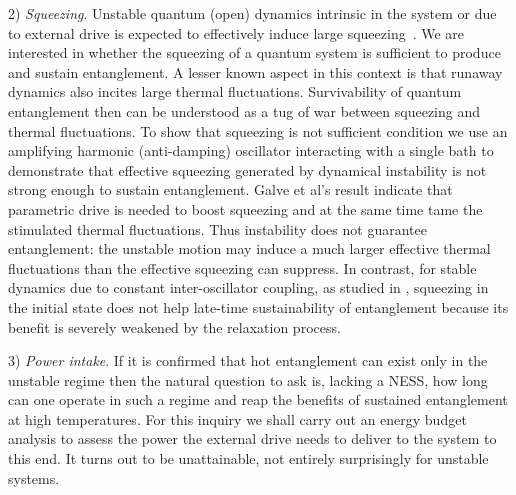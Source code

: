 \documentclass[11pt,a4paper]{article}
\begin{document}
2) \textit{Squeezing}. {Unstable quantum (open) dynamics intrinsic in the system or due to external drive is expected to effectively induce large squeezing~\cite{GP85, GS86, HH22, GV20}. We are interested in whether the squeezing of a quantum system is sufficient to produce and sustain entanglement. A lesser known aspect in this context is that runaway dynamics also incites large thermal fluctuations. Survivability of quantum entanglement then can be understood as a tug of war between squeezing and thermal fluctuations. To show that squeezing is not sufficient condition we use an {amplifying harmonic (anti-damping)} oscillator interacting with a single bath to demonstrate that effective squeezing generated by dynamical instability is not strong enough to sustain entanglement.  Galve et al's result indicate that parametric drive is needed to boost squeezing and at the same time tame the stimulated thermal fluctuations. Thus instability does not guarantee entanglement: the unstable motion may induce a much larger effective thermal fluctuations than the effective squeezing can suppress. In contrast, for stable dynamics due to constant inter-oscillator coupling, as studied in \cite{HAH22}, squeezing in the initial state does not help late-time sustainability of entanglement because its benefit is severely weakened by the relaxation process.}


3) \textit{Power intake}.  
If it is confirmed that hot entanglement can exist only  in the unstable regime then the natural question to ask is, lacking a NESS, how long can one operate in such a regime and reap the benefits of sustained entanglement at high temperatures. For this inquiry we shall carry out an energy budget analysis to assess the power the external drive needs to deliver to the system to this end. It turns out to be unattainable, not entirely surprisingly for unstable systems.    
\end{document}
